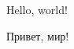 \documentclass{article}
\begin{document}
    Hello, world!

    Привет, мир!

    
    

    \newpage
    \printbibliography
\end{document}
